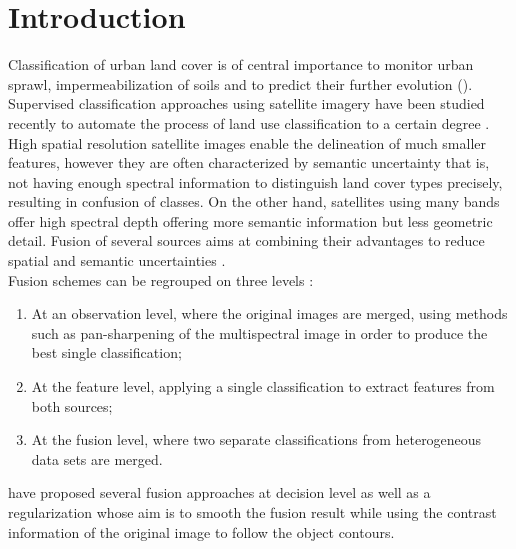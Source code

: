 \documentclass[10pt]{article}
\begin{document}
\makeMATIS


\tableofcontents
\newpage
\section{Introduction}

Classification of urban land cover is of central importance to monitor urban sprawl, impermeabilization of soils and to predict their further evolution (\cite{kurtz_histogram_2012,kurtz_extraction_2012,wemmert_multiresolution_2009}). Supervised classification approaches using satellite imagery have been studied recently to automate the process of land use classification to a certain degree  \parencite{inglada_operational_2017,li_urban_2016}. High spatial resolution satellite images enable the delineation of much smaller features, however they are often characterized by semantic uncertainty that is, not having enough spectral information to distinguish land cover types precisely, resulting in confusion of classes. On the other hand, satellites using many bands offer high spectral depth offering more semantic information but less geometric detail. Fusion of several sources aims at combining their advantages to reduce spatial and semantic uncertainties \parencite{ouerghemmi_two-step_2017,fauvel_decision_fusion,hervieu_fusion_2016}. \\

Fusion schemes can be regrouped on three levels \parencite{ouerghemmi_two-step_2017}:
\begin{enumerate}
    \item At an observation level, where the original images are merged, using methods such as pan-sharpening of the multispectral image in order to produce the best single classification;
    \item At the feature level, applying a single classification to extract features from both sources;
    \item At the fusion level, where two separate classifications from heterogeneous data sets are merged.
\end{enumerate}

\cite{ouerghemmi_two-step_2017} have proposed several fusion approaches at decision level as well as a regularization whose aim is to smooth the fusion result while using the contrast information of the original image to follow the object contours. \\
\end{document}
